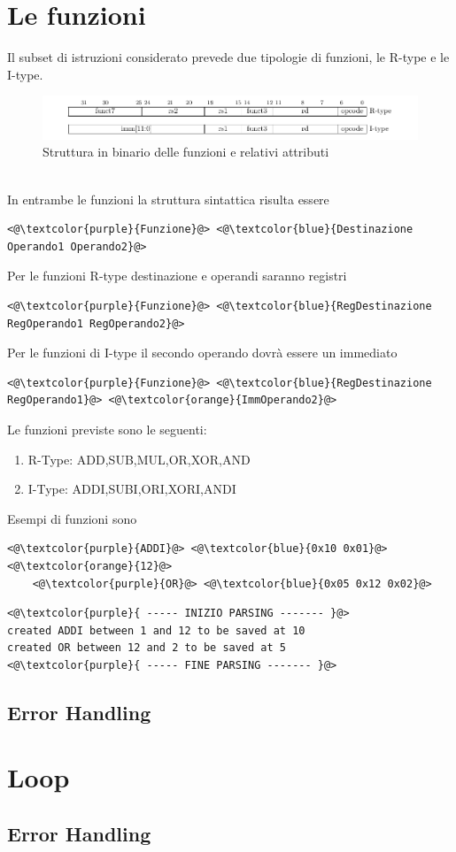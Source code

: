 \section{Le funzioni}
Il subset di istruzioni considerato prevede due tipologie di funzioni, le R-type e le I-type.
\begin{figure}[h]
    \centering
    \includegraphics[scale=0.5]{functionTypes.png}
    \caption{Struttura in binario delle funzioni e relativi attributi}
    \label{fig:err1}
\end{figure}
\\
In entrambe le funzioni la struttura sintattica risulta essere
\begin{lstlisting}[numbers=none]
    <@\textcolor{purple}{Funzione}@> <@\textcolor{blue}{Destinazione Operando1 Operando2}@>
\end{lstlisting}
Per le funzioni R-type destinazione e operandi saranno registri
\begin{lstlisting}[numbers=none]
    <@\textcolor{purple}{Funzione}@> <@\textcolor{blue}{RegDestinazione RegOperando1 RegOperando2}@>
\end{lstlisting}
Per le funzioni di I-type il secondo operando dovrà essere un immediato
\begin{lstlisting}[numbers=none]
    <@\textcolor{purple}{Funzione}@> <@\textcolor{blue}{RegDestinazione RegOperando1}@> <@\textcolor{orange}{ImmOperando2}@>
\end{lstlisting}

Le funzioni previste sono le seguenti: 
\begin{enumerate}
    \item R-Type: ADD,SUB,MUL,OR,XOR,AND
    \item I-Type: ADDI,SUBI,ORI,XORI,ANDI
\end{enumerate}
Esempi di funzioni sono 
\begin{lstlisting}[caption=input]
    <@\textcolor{purple}{ADDI}@> <@\textcolor{blue}{0x10 0x01}@> <@\textcolor{orange}{12}@>
    <@\textcolor{purple}{OR}@> <@\textcolor{blue}{0x05 0x12 0x02}@>
\end{lstlisting}
\begin{lstlisting}[caption=output]
<@\textcolor{purple}{ ----- INIZIO PARSING ------- }@>
created ADDI between 1 and 12 to be saved at 10
created OR between 12 and 2 to be saved at 5
<@\textcolor{purple}{ ----- FINE PARSING ------- }@>
\end{lstlisting}
\subsection{Error Handling}
\section{Loop}
\subsection{Error Handling}



